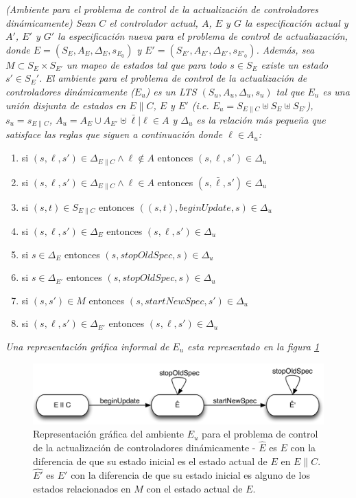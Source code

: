 \begin{nahaDef}
\emph{(Ambiente para el problema de control de la actualización de controladores dinámicamente) Sean $C$ el controlador
actual, $A$, $E$ y $G$ la especificación actual y $A'$, $E'$ y $G'$ la especificación nueva para el problema de
control de actualiazación, donde $E = (S_E, A_E, \Delta_E, s_{E_0})$ y $E' = (S_{E'}, A_{E'}, \Delta_{E'}, s_{E'_0})$.
Además, sea $M \subset S_E \times S_{E'}$ un mapeo de estados tal que para todo $s \in S_E$ existe un estado $s' \in
{S_E'}$. El ambiente para el problema de control de la actualización de controladores dinámicamente ($E_u$) es un LTS
$(S_u,A_u,\Delta_u,s_u)$ tal que $E_u$ es una unión disjunta de estados en $E\|C$, $E$ y $E'$ (i.e. $E_u = S_{E\|C}
\uplus S_E \uplus S_{E'}$), $s_u = s_{E\|C}$, $A_u = A_E \cup A_{E'} \uplus \bar{\ell}|\ell \in A$ y $\Delta_u$ es la relación más
pequeña que satisface las reglas que siguen a continuación donde $\ell \in A_u$:}

\begin{enumerate}
\label{update_environment_def}
\itemsep-4mm
\renewcommand*\labelenumi{[\theenumi]}
\item si $(s,\ell,s') \in \Delta_{E\|C} \wedge \ell \notin A$ entonces $(s,\ell,s') \in \Delta_u$
\item si $(s,\ell,s') \in \Delta_{E\|C} \wedge \ell \in A$ entonces $(s,\bar{\ell},s') \in \Delta_u$
\item si $(s,t) \in S_{E\|C}$ entonces $((s,t), beginUpdate,s) \in \Delta_u$
\item si $(s,\ell,s') \in \Delta_E$ entonces $(s,\ell,s') \in \Delta_u$
\item si $s \in \Delta_E$ entonces $(s,stopOldSpec,s) \in \Delta_u$
\item si $s \in \Delta_{E'}$ entonces $(s,stopOldSpec,s) \in \Delta_u$
\item si $(s,s') \in M$ entonces $(s,startNewSpec,s') \in \Delta_u$
\item si $(s,\ell,s') \in \Delta_{E'}$ entonces $(s,\ell,s') \in \Delta_u$
\end{enumerate}
\emph{Una representación gráfica informal de $E_u$ esta representado en la figura \ref{update_environment}}
\end{nahaDef}

\begin{figure}
\centering
\includegraphics[scale=0.35]{img/E_u.png}
\caption{Representación gráfica del ambiente $E_u$ para el problema de control de la actualización de controladores
dinámicamente - $\hat{E}$ es $E$ con la diferencia de que su estado inicial es el estado actual de $E$ en $E\|C$.
$\hat{E'}$ es $E'$ con la diferencia de que su estado inicial es alguno de los estados relacionados en $M$ con el estado
actual de $E$.}
\label{update_environment}
\end{figure}

